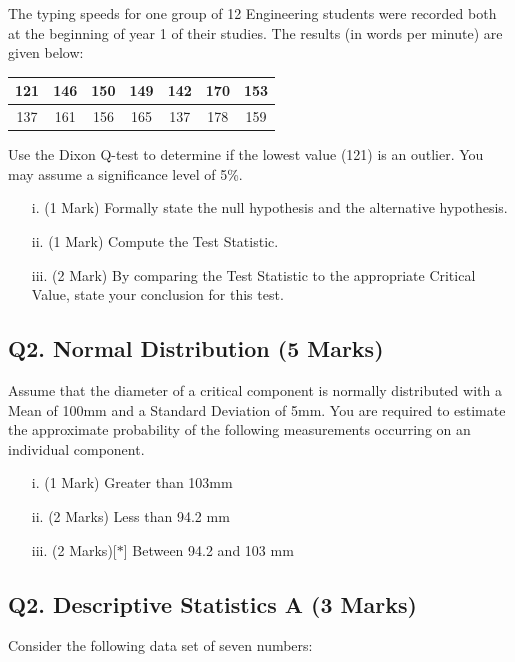 \documentclass[a4paper,12pt]{article}
\begin{document}
The typing speeds for one group of 12 Engineering students were recorded both at the beginning of year 1 of their studies. The results (in words per minute) are given below:

\begin{center}
	\begin{tabular}{|c|c|c|c|c|c|c|}
		\hline
		121 & 146 & 150 &149 &142 &170& 153\\ \hline
		137 & 161 & 156& 165& 137& 178& 159
		\\ \hline
	\end{tabular}
\end{center}
Use the Dixon Q-test to determine if the lowest value (121) is an outlier. You may assume a significance level of 5\%.

\begin{itemize}
	\item[i.] (1 Mark) Formally state the null hypothesis and the alternative hypothesis.
	\item[ii.] (1 Mark) Compute the Test Statistic.
	\item[iii.] (2 Mark) By comparing the Test Statistic to the appropriate Critical Value, state your conclusion for this test.
\end{itemize}
\newpage
\subsection*{Q2. Normal Distribution (5 Marks)} %
Assume that the diameter of a critical component is normally distributed with a Mean of 100mm and a Standard Deviation of 5mm. You are required  to estimate the approximate probability of the following measurements occurring on an individual component.
\begin{itemize}
	\item [i.](1 Mark)	Greater than 103mm
	\item [ii.](2 Marks) Less than 94.2 mm
	\item [iii.](2 Marks)[$\ast$] Between 94.2 and 103 mm
\end{itemize}
\bigskip
\subsection*{Q2. Descriptive Statistics A (3 Marks)} %
Consider the following data set of seven numbers:
\end{document}
